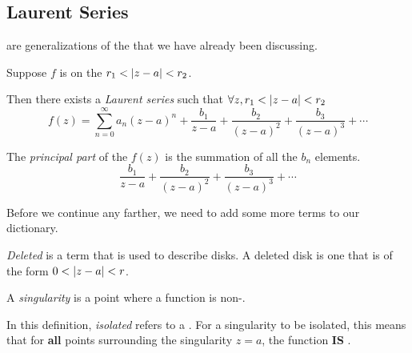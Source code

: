 \subsection{Laurent Series}\label{def:Laurent_Series}
 are generalizations of the  that we have already been discussing.

\begin{theorem}\label{thm:Laurent_Series}
  Suppose $f$ is  on the  $r_{1} < \left\lvert z-a \right\rvert < r_{2}$.

  Then there exists a \emph{Laurent series} such that $\forall z, r_{1} < \left\lvert z-a \right\rvert < r_{2}$
  \begin{equation}\label{eq:Laurent_Series}
    f(z) = \sum_{n=0}^{\infty} a_{n} {(z-a)}^{n} + \frac{b_{1}}{z-a} + \frac{b_{2}}{{(z-a)}^{2}} + \frac{b_{3}}{{(z-a)}^{3}} + \cdots
  \end{equation}
\end{theorem}

\begin{definition}\label{def:Principal_Part}
  The \emph{principal part} of the  $f(z)$ is the summation of all the $b_{n}$ elements.
  \begin{equation}\label{eq:Principal_Part}
    \frac{b_{1}}{z-a} + \frac{b_{2}}{{(z-a)}^{2}} + \frac{b_{3}}{{(z-a)}^{3}} + \cdots
  \end{equation}
\end{definition}

Before we continue any farther, we need to add some more terms to our dictionary.

\begin{definition}[Deleted]\label{def:Deleted}
  \emph{Deleted} is a term that is used to describe disks.
  A deleted disk is one that is of the form $0 < \left\lvert z-a \right\rvert < r$.
\end{definition}

\begin{definition}[Singularity]\label{def:Singularity}
  A \emph{singularity} is a point where a function is non-.
\end{definition}

\begin{definition}[Isolated]\label{def:Isolated_Singularity}
  In this definition, \emph{isolated} refers to a .
  For a singularity to be isolated, this means that for \textbf{all} points surrounding the singularity $z=a$, the function \textbf{IS} .
\end{definition}


